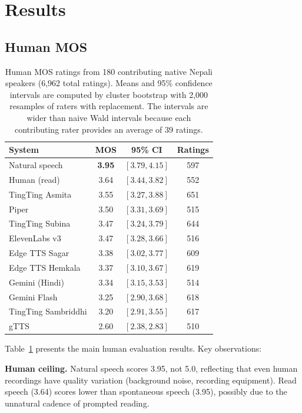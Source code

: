\documentclass[11pt]{article}
\begin{document}
\section{Results}

\subsection{Human MOS}

\begin{table}[t]
\centering
\caption{Human MOS ratings from 180 contributing native Nepali speakers (6,962 total ratings). Means and 95\% confidence intervals are computed by cluster bootstrap with 2{,}000 resamples of raters with replacement. The intervals are wider than naive Wald intervals because each contributing rater provides an average of 39 ratings.}
\label{tab:human_mos}
\begin{tabular}{lccc}
\toprule
System & MOS & 95\% CI & Ratings \\
\midrule
Natural speech & \textbf{3.95} & $[3.79, 4.15]$ & 597 \\
Human (read) & 3.64 & $[3.44, 3.82]$ & 552 \\
\midrule
TingTing Asmita & 3.55 & $[3.27, 3.88]$ & 651 \\
Piper & 3.50 & $[3.31, 3.69]$ & 515 \\
TingTing Subina & 3.47 & $[3.24, 3.79]$ & 644 \\
ElevenLabs v3 & 3.47 & $[3.28, 3.66]$ & 516 \\
Edge TTS Sagar & 3.38 & $[3.02, 3.77]$ & 609 \\
Edge TTS Hemkala & 3.37 & $[3.10, 3.67]$ & 619 \\
Gemini (Hindi) & 3.34 & $[3.15, 3.53]$ & 514 \\
Gemini Flash & 3.25 & $[2.90, 3.68]$ & 618 \\
TingTing Sambriddhi & 3.20 & $[2.91, 3.55]$ & 617 \\
gTTS & 2.60 & $[2.38, 2.83]$ & 510 \\
\bottomrule
\end{tabular}
\end{table}

Table~\ref{tab:human_mos} presents the main human evaluation results. Key observations:

\textbf{Human ceiling.} Natural speech scores 3.95, not 5.0, reflecting that even human recordings have quality variation (background noise, recording equipment). Read speech (3.64) scores lower than spontaneous speech (3.95), possibly due to the unnatural cadence of prompted reading.
\end{document}
